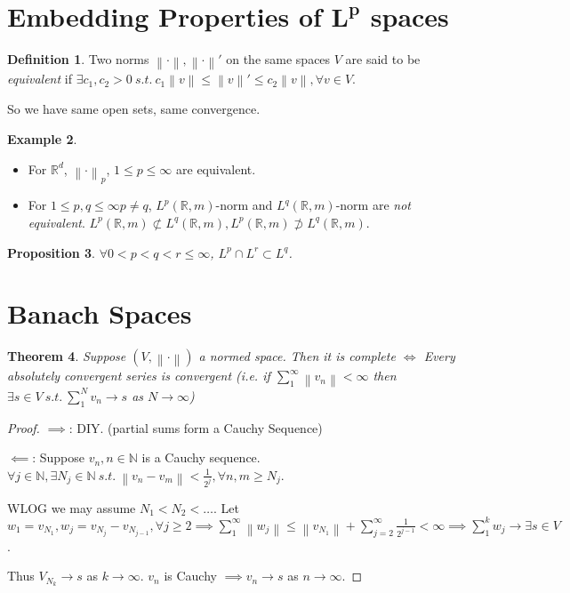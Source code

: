 \documentclass{report}
\newcommand{\R}{\mathbb{R}}
\newcommand{\N}{\mathbb{N}}
\newcommand{\st}{\ s.t.\ }
\newcommand{\norm}[1]{\left\| #1 \right\|}
\newtheorem{theorem}{Theorem}[chapter]
\newtheorem{proposition}[theorem]{Proposition}
\theoremstyle{definition}
\newtheorem{definition}[theorem]{Definition}
\newtheorem{example}[theorem]{Example}
\theoremstyle{remark}
\newcommand{\fnl}{\parbox[t]{0\linewidth}{}}
\newcommand*\ttlmath[2]{\texorpdfstring{$\boldsymbol{#1}$}{#2}}
\begin{document}
\section{Embedding Properties of \ttlmath{L^p}{L\^p} spaces}
\begin{definition}
	Two norms $\norm{\cdot}, \norm{\cdot}'$ on the same spaces $V$ are said to be \emph{equivalent} if $\exists c_1, c_2 > 0 \st c_1\norm{v} \leq \norm{v}' \leq c_2 \norm{v}, \forall v \in V$.
\end{definition}
So we have same open sets, same convergence.
\begin{example} \fnl
	\begin{itemize}
		\item For $\R^d$, $\norm{\cdot}_p$, $1 \leq p \leq \infty$ are equivalent.
		\item For $1 \leq p, q \leq \infty p \neq q$, $L^p(\R, m)$-norm and $L^q(\R, m)$-norm are \emph{not equivalent}. $L^p(\R, m) \not\subset L^q(\R, m), L^p(\R, m) \not\supset L^q(\R, m)$.
	\end{itemize}
\end{example}

\begin{proposition}
	$\forall 0 < p < q < r \leq \infty$, $L^p \cap L^r \subset L^q$.
\end{proposition}

\section{Banach Spaces}

\begin{theorem}
	Suppose $(V, \norm{\cdot})$ a normed space. Then it is complete $\iff$ Every absolutely convergent series is convergent (i.e. if $\sum_{1}^\infty \norm{v_n} < \infty$ then $\exists s \in V \st \sum_{1}^N v_n \to s$ as $N \to \infty$)
\end{theorem}
\begin{proof}
	$\implies$: DIY. (partial sums form a Cauchy Sequence)

	$\impliedby$: Suppose $v_n, n \in \N$ is a Cauchy sequence. $\forall j \in \N, \exists N_j \in \N \st \norm{v_n - v_m} < \frac{1}{2^j}, \forall n, m \geq N_j$.

	WLOG we may assume $N_1 < N_2 < \ldots$. Let $w_1 = v_{N_1}, w_j = v_{N_j} - v_{N_{j-1}}, \forall j \geq 2 \implies \sum_{1}^\infty \norm{w_j} \leq \norm{v_{N_1}} + \sum_{j=2}^\infty \frac{1}{2^{j-1}} < \infty \implies \sum_{1}^k w_j \to \exists s \in V$.
	
	Thus $V_{N_{k}} \to s$ as $k \to \infty$. $v_n$ is Cauchy $\implies v_n \to s$ as $n \to \infty$.
\end{proof}
\end{document}
